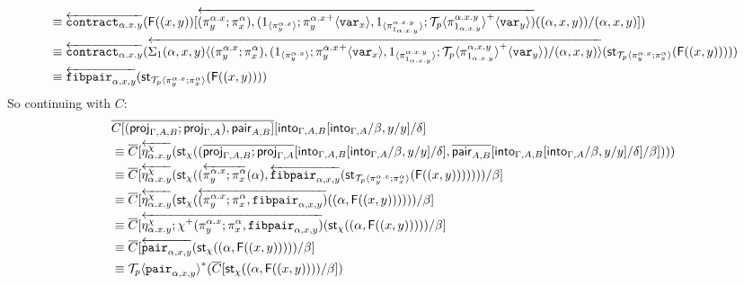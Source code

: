 \documentclass[10pt]{article}
\theoremstyle{definition}
\newcommand{\rewrite}[2]{\overleftarrow{#1}(#2)}
\newcommand\St[2]{\ensuremath{{#1}^*(#2)}}
\newcommand\StI[2]{\ensuremath{\mathsf{st}_{#1}(#2)}}
\newcommand\FI[1]{\ensuremath{\mathsf{F}{(#1)}}}
\newcommand\TrPlus[2]{\ensuremath{{#1}^+(#2)}}
\newcommand\ApEl[2]{\mathcal{T}_{#1}\langle#2\rangle}
\newcommand\ap[2]{\ensuremath{#1 \langle #2 \rangle }}
\newcommand\ApPlus[2]{\ensuremath{{#1}^+ \langle #2 \rangle }}
\begin{document}
\begin{enumerate}[style = multiline, labelwidth = 80pt]
\begin{align*}
&\equiv \rewrite{\contract{\alpha.x.y}}{\FI{(x, y)}[\rewrite{(\pi^{\alpha.x}_y;\pi^\alpha_x), (\ApOne{\pi^{\alpha.x}_y};\ApPlus{\pi^{\alpha.x}_y}{\var{x}}, \ApOne{\pi^{\alpha.x.y}_{1_{\alpha.x.y}}};\ApPlus{\ApEl{p}{\pi^{\alpha.x.y}_{1_{\alpha.x.y}}}}{\var{y}})}{(\alpha,x,y)}/(\alpha,x,y)]} \\
&\equiv \rewrite{\contract{\alpha.x.y}}{\rewrite{\ap{\Sigma_1(\alpha,x,y)}{(\pi^{\alpha.x}_y;\pi^\alpha_x), (\ApOne{\pi^{\alpha.x}_y};\ApPlus{\pi^{\alpha.x}_y}{\var{x}}, \ApOne{\pi^{\alpha.x.y}_{1_{\alpha.x.y}}};\ApPlus{\ApEl{p}{\pi^{\alpha.x.y}_{1_{\alpha.x.y}}}}{\var{y}})/(\alpha,x,y)}}{\StI{\ApEl{p}{\pi^{\alpha.x}_y;\pi^{\alpha}_x}}{\FI{(x, y)}}}} \\
&\equiv \rewrite{\fibpair{\alpha,x,y}}{\StI{\ApEl{p}{\pi^{\alpha.x}_y;\pi^{\alpha}_x}}{\FI{(x, y)}}}
\end{align*}
So continuing with $C$:
\begin{align*}
&\upstairs{C[(\proj{\Gamma, A, B};\proj{\Gamma, A}), \qpair{A,B}]}[\into{\Gamma, A, B}[\into{\Gamma, A}/\beta, y/y] /\delta] \\
&\equiv \upstairs{C}[\rewrite{\eta^\chi_{\alpha.x.y}}{\StI{\chi}{(\upstairs{\proj{\Gamma, A, B};\proj{\Gamma, A}}[\into{\Gamma, A, B}[\into{\Gamma, A}/\beta, y/y] /\delta], \upstairs{\qpair{A,B}}[\into{\Gamma, A, B}[\into{\Gamma, A}/\beta, y/y] /\delta]/\beta])}} \\
&\equiv \upstairs{C}[\rewrite{\eta^\chi_{\alpha.x.y}}{\StI{\chi}{(\rewrite{\pi^{\alpha.x}_y;\pi^\alpha_x}{\alpha}, \rewrite{\fibpair{\alpha,x,y}}{\StI{\ApEl{p}{\pi^{\alpha.x}_y;\pi^{\alpha}_x}}{\FI{(x, y)}}})}}/\beta] \\
&\equiv \upstairs{C}[\rewrite{\eta^\chi_{\alpha.x.y}}{\StI{\chi}{\rewrite{(\pi^{\alpha.x}_y;\pi^\alpha_x, \fibpair{\alpha,x,y})}{(\alpha, \FI{(x, y)})}}}/\beta] \\
&\equiv \upstairs{C}[\rewrite{\eta^\chi_{\alpha.x.y};\TrPlus{\chi}{\pi^{\alpha.x}_y;\pi^\alpha_x, \fibpair{\alpha,x,y}}}{\StI{\chi}{(\alpha, \FI{(x, y)})}}/\beta] \\
&\equiv \upstairs{C}[\rewrite{\pair{\alpha,x,y}}{\StI{\chi}{(\alpha, \FI{(x, y)})}}/\beta] \\
&\equiv \St{\ApEl{p}{\pair{\alpha,x,y}}}{\upstairs{C}[\StI{\chi}{(\alpha, \FI{(x, y)})}/\beta]}
\end{align*}


\end{enumerate}
\end{document}
